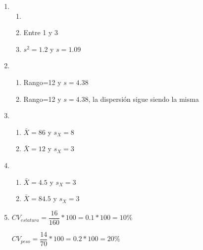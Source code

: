 \documentclass[letterpaper]{article}
\begin{document}
\begin{enumerate}
	\item 
\begin{enumerate}
	\item 
	\item Entre 1 y 3
	\item $s^2=1.2$ y $s=1.09$
\end{enumerate}
\item 
\begin{enumerate}
	\item Rango=12 y $s=4.38$
	\item Rango=12 y $s=4.38$, la dispersión sigue siendo la misma
\end{enumerate}

\item
\begin{enumerate}
	\item $\bar{X}=86$ y $s_X=8$
	\item $\bar{X}=12$ y $s_X=3$
\end{enumerate}

\item 
\begin{enumerate}
	\item $\bar{X}=4.5$ y $s_X=3$
	\item $\bar{X}=84.5$ y $s_X=3$
\end{enumerate}

\item $CV_{estatura}=\dfrac{16}{160}*100=0.1*100=10\%$

$CV_{peso}=\dfrac{14}{70}*100=0.2*100=20\%$
\end{enumerate}
\end{document}
